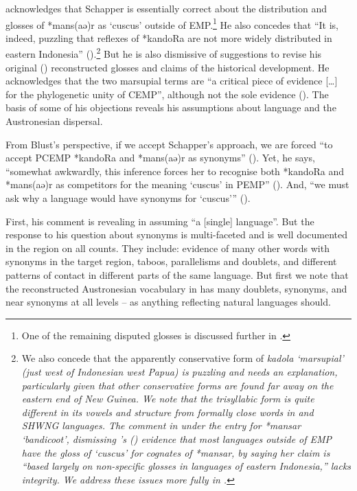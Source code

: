 \citet{Blust2012b} acknowledges that Schapper is essentially
correct about the distribution
and glosses of *mans(aə)r as ‘cuscus’ outside of EMP.\footnote{
One of the remaining disputed glosses is discussed further in .}
He also concedes that “It is,
indeed, puzzling that reflexes of *kandoRa are not more widely
distributed in eastern Indonesia” (\citeyear[267]{Blust2012b}).\footnote{
		We also concede that the apparently conservative form of  \it{kadola}
		‘marsupial’ (just west of Indonesian west Papua) is puzzling
		and needs an explanation,
		particularly given that other conservative forms are found far
		away on the eastern end of New Guinea.
		We note that the trisyllabic  form is quite different
		in its vowels and structure from formally close words in  and SHWNG languages.
		The comment in \citet{BlustTrussel2020} under the entry for *mansar ‘bandicoot’,
		dismissing \citeauthor{Schapper2011}’s (\citeyear{Schapper2011}) evidence that most languages outside
		of EMP have the gloss of ‘cuscus’ for cognates of *mansar,
		by saying her claim is “based largely on non-specific glosses
		in languages of eastern Indonesia,” lacks integrity.
		We address these issues more fully in .}
But he is also dismissive of suggestions to revise his original (\citeyear{Blust1982})
reconstructed glosses and claims of the historical development.
He acknowledges that the two marsupial terms are “a critical
piece of evidence [{\ldots}] for the phylogenetic unity of CEMP”,
although not the sole evidence (\citeyear[262]{Blust2012b}).
The basis of some of his objections reveals his assumptions about
language and the Austronesian dispersal.

From Blust’s perspective, if we accept Schapper’s approach,
we are forced “to accept PCEMP *kandoRa
and *mans(aə)r as synonyms” (\citeyear[267]{Blust2012b}).
Yet, he says, “somewhat awkwardly,
this inference forces her to recognise both *kandoRa
and *mans(aə)r as competitors for the
meaning ‘cuscus’ in PEMP” (\citeyear[267]{Blust2012b}).
And, “we must ask why a language
would have synonyms for ‘cuscus’” (\citeyear[268]{Blust2012b}).

First, his comment is revealing in assuming “a [single] language”.
But the response to his question about synonyms is multi-faceted
and is well documented in the region on all counts.
They include: evidence of many other words with synonyms in the
target region, taboos, parallelisms and doublets, and different patterns of
contact in different parts of the same language.
But first we note that the reconstructed Austronesian vocabulary
in \citet{BlustTrussel2020} has many doublets,
synonyms, and near synonyms at all levels -- as
anything reflecting natural languages should.

